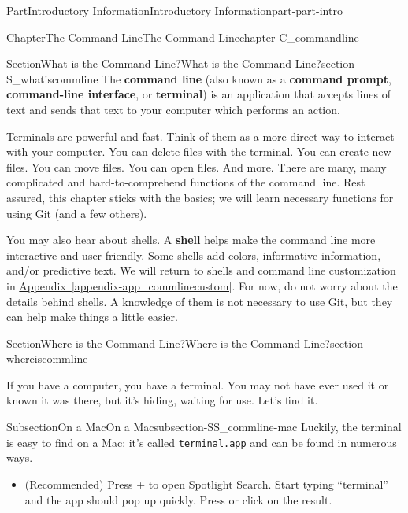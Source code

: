 \documentclass[oneside,10pt,]{book}
\newcommand{\xreffont}{\relax}
\newcommand{\mono}[1]{\texttt{#1}}
\newcommand{\terminology}[1]{\textbf{#1}}
\newcommand{\kbd}[1]{\keys{{#1}}}
\begin{document}
\begin{partptx}{Part}{Introductory Information}{}{Introductory Information}{}{}{part-part-intro}
\begin{chapterptx}{Chapter}{The Command Line}{}{The Command Line}{}{}{chapter-C_commandline}
\begin{sectionptx}{Section}{What is the Command Line?}{}{What is the Command Line?}{}{}{section-S_whatiscommline}
The \terminology{command line} (also known as a \terminology{command prompt}, \terminology{command-line interface}, or \terminology{terminal}) is an application that accepts lines of text and sends that text to your computer which performs an action.%
\par
Terminals are powerful and fast. Think of them as a more direct way to interact with your computer. You can delete files with the terminal. You can create new files. You can move files. You can open files. And more. There are many, many complicated and hard-to-comprehend functions of the command line. Rest assured, this chapter sticks with the basics; we will learn necessary functions for using Git (and a few others).%
\par
You may also hear about shells. A \terminology{shell} helps make the command line more interactive and user friendly. Some shells add colors,  informative information, and\slash{}or predictive text. We will return to shells and command line customization in \hyperref[appendix-app_commlinecustom]{Appendix~{\xreffont\ref{appendix-app_commlinecustom}}}. For now, do not worry about the details behind shells. A knowledge of them is not necessary to use Git, but they can help make things a little easier.%
\end{sectionptx}
%
%
\typeout{************************************************}
\typeout{************************************************}
%
\begin{sectionptx}{Section}{Where is the Command Line?}{}{Where is the Command Line?}{}{}{section-whereiscommline}
%
%
\begin{introduction}{}%
If you have a computer, you have a terminal. You may not have ever used it or known it was there, but it's hiding, waiting for use. Let's find it.%
\end{introduction}%
%
%
\typeout{************************************************}
\typeout{************************************************}
%
\begin{subsectionptx}{Subsection}{On a Mac}{}{On a Mac}{}{}{subsection-SS_commline-mac}
%
Luckily, the terminal is easy to find on a Mac: it's called \mono{terminal.app} and can be found in numerous ways.%
\begin{itemize}[label=\textbullet]
\item{}(Recommended) Press \kbd{Command} + \kbd{Space} to open Spotlight Search. Start typing ``terminal'' and the app should pop up quickly. Press \kbd{Enter} or click on the result.%

\end{itemize}
\end{subsectionptx}
\end{sectionptx}
\end{chapterptx}
\end{partptx}
\end{document}
